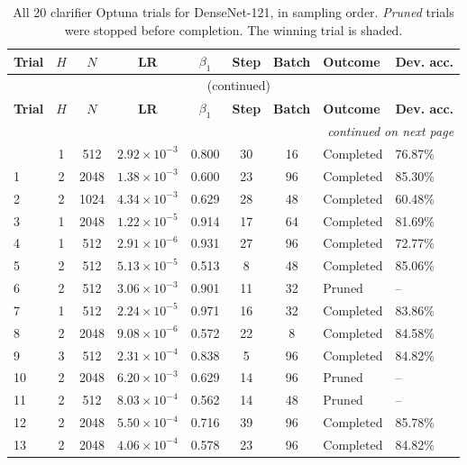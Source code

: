 {\footnotesize
\begin{longtable}{lccccccll}
\caption{All 20 clarifier Optuna trials for DenseNet-121, in sampling order. \emph{Pruned} trials were stopped before completion. The winning trial is shaded.}
\label{tab:trials_densenet121} \\
\toprule
\textbf{Trial} & \textbf{$H$} & \textbf{$N$} & \textbf{LR} & \textbf{$\beta_1$} & \textbf{Step} & \textbf{Batch} & \textbf{Outcome} & \textbf{Dev. acc.} \\
\midrule
\endfirsthead
\multicolumn{9}{c}{\tablename\ \thetable{} (continued)} \\
\toprule
\textbf{Trial} & \textbf{$H$} & \textbf{$N$} & \textbf{LR} & \textbf{$\beta_1$} & \textbf{Step} & \textbf{Batch} & \textbf{Outcome} & \textbf{Dev. acc.} \\
\midrule
\endhead
\midrule
\multicolumn{9}{r}{\emph{continued on next page}} \\
\endfoot
\bottomrule
\endlastfoot
0 & 1 & 512 & $2.92\times10^{-3}$ & 0.800 & 30 & 16 & Completed & 76.87\% \\
1 & 2 & 2048 & $1.38\times10^{-3}$ & 0.600 & 23 & 96 & Completed & 85.30\% \\
2 & 2 & 1024 & $4.34\times10^{-3}$ & 0.629 & 28 & 48 & Completed & 60.48\% \\
3 & 1 & 2048 & $1.22\times10^{-5}$ & 0.914 & 17 & 64 & Completed & 81.69\% \\
4 & 1 & 512 & $2.91\times10^{-6}$ & 0.931 & 27 & 96 & Completed & 72.77\% \\
5 & 2 & 512 & $5.13\times10^{-5}$ & 0.513 & 8 & 48 & Completed & 85.06\% \\
6 & 2 & 512 & $3.06\times10^{-3}$ & 0.901 & 11 & 32 & Pruned & -- \\
7 & 1 & 512 & $2.24\times10^{-5}$ & 0.971 & 16 & 32 & Completed & 83.86\% \\
8 & 2 & 2048 & $9.08\times10^{-6}$ & 0.572 & 22 & 8 & Completed & 84.58\% \\
9 & 3 & 512 & $2.31\times10^{-4}$ & 0.838 & 5 & 96 & Completed & 84.82\% \\
10 & 2 & 2048 & $6.20\times10^{-3}$ & 0.629 & 14 & 96 & Pruned & -- \\
11 & 2 & 512 & $8.03\times10^{-4}$ & 0.562 & 14 & 48 & Pruned & -- \\
12 & 2 & 2048 & $5.50\times10^{-4}$ & 0.716 & 39 & 96 & Completed & 85.78\% \\
13 & 2 & 2048 & $4.06\times10^{-4}$ & 0.578 & 23 & 96 & Completed & 84.82\% \\

\end{longtable}}
